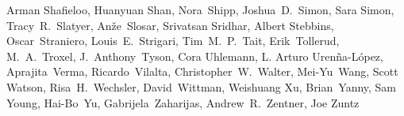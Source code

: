 \begin{raggedright}
Arman Shafieloo,
Huanyuan Shan,
Nora~Shipp,
Joshua~D.~Simon,
Sara Simon,
Tracy~R.~Slatyer,
An\v{z}e~Slosar,
Srivatsan Sridhar,
Albert Stebbins,
Oscar~Straniero,
Louis~E.~Strigari,
Tim~M.~P.~Tait,
Erik~Tollerud,
M.~A.~Troxel,
J.~Anthony~Tyson,
Cora Uhlemann,
L. Arturo Uren\~na-L\'opez,
Aprajita~Verma,
Ricardo~Vilalta,
Christopher~W.~Walter,
Mei-Yu~Wang,
Scott Watson,
Risa~H.~Wechsler,
David~Wittman,
Weishuang Xu,
Brian~Yanny,
Sam Young,
Hai-Bo~Yu,
Gabrijela~Zaharijas,
Andrew~R.~Zentner,
Joe Zuntz

\end{raggedright}
